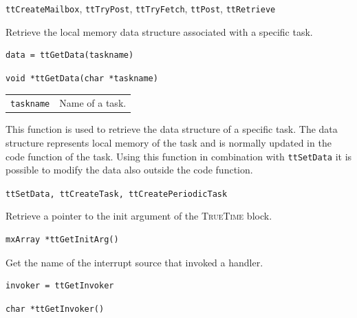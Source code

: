 \documentclass[final,twoside]{rapport}
\begin{document}
\seealso
{\tt ttCreateMailbox}, {\tt ttTryPost}, {\tt ttTryFetch}, {\tt ttPost},
{\tt ttRetrieve}



\purpose
Retrieve the local memory data structure associated with a specific task.

\Msyntax
\begin{verbatim}
data = ttGetData(taskname)
\end{verbatim}

\Csyntax
\begin{verbatim}
void *ttGetData(char *taskname)
\end{verbatim}


\args
\begin{tabularx}{\hsize}{l>{\raggedright\arraybackslash}X}
  {\tt taskname} & Name of a task. \\
\end{tabularx}

\descr This function is used to retrieve the data structure of a
specific task. The data structure represents local memory of the task
and is normally updated in the code function of the task. Using this
function in combination with \texttt{ttSetData} it is possible to
modify the data also outside the code function.

\seealso
\texttt{ttSetData, ttCreateTask, ttCreatePeriodicTask}



\purpose
Retrieve a pointer to the init argument of the \textsc{TrueTime} block.

\Csyntax
\begin{verbatim}
mxArray *ttGetInitArg()
\end{verbatim}



\purpose
Get the name of the interrupt source that invoked a handler.

\Msyntax
\begin{verbatim}
invoker = ttGetInvoker
\end{verbatim}

\Csyntax
\begin{verbatim}
char *ttGetInvoker()
\end{verbatim}
\end{document}
